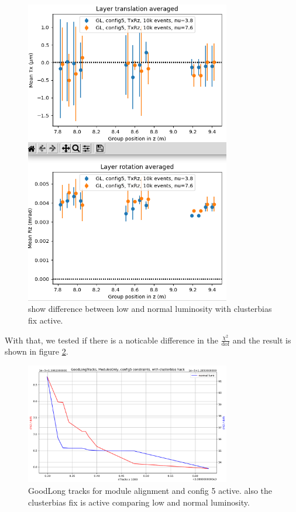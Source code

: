 \begin{figure}
  \centering
  \includegraphics[width=0.8\textwidth]{plots/jan_24_2022/low_normal_with_hack.png}
  \caption{show difference between low and normal luminosity with clusterbias fix active.}
  \label{fig:lumi_low_normal_hack_on}
\end{figure}

With that, we tested if there is a noticable difference in the $\frac{\chi^2}{\text{dof}}$
and the result is shown in figure \ref{fig:GL_lumi_low_normal_hack_on}.

\begin{figure}
  \centering
  \includegraphics[width=0.8\textwidth]{plots/feb_2_2022/GL_modules_c5_cb_hackactive_low_normal_lumi.png}
  \caption{GoodLong tracks for module alignment and config 5 active. also the clusterbias fix is active comparing low and normal luminosity.}
  \label{fig:GL_lumi_low_normal_hack_on}
\end{figure}

